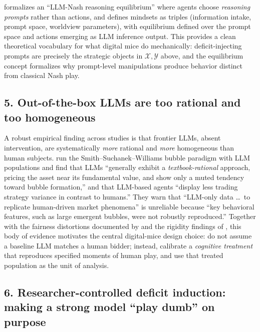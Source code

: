 \citet{zhu2025llmnash} formalizes an ``LLM-Nash reasoning equilibrium''
where agents choose \emph{reasoning prompts} rather than actions, and
defines mindsets as triples (information intake, prompt space,
worldview parameters), with equilibrium defined over the prompt space
and actions emerging as LLM inference output. This provides a clean
theoretical vocabulary for what digital mice do mechanically:
deficit-injecting prompts are precisely the strategic objects in
$\mathcal{X}, \mathcal{Y}$ above, and the equilibrium concept formalizes
why prompt-level manipulations produce behavior distinct from
classical Nash play.

\subsection*{5. Out-of-the-box LLMs are too rational and too homogeneous}

A robust empirical finding across studies is that frontier LLMs,
absent intervention, are systematically \emph{more} rational and
\emph{more} homogeneous than human subjects.
\citet{henning2025bubbles} run the Smith--Suchanek--Williams bubble
paradigm with LLM populations and find that LLMs ``generally exhibit
a \emph{textbook-rational} approach, pricing the asset near its
fundamental value, and show only a muted tendency toward bubble
formation,'' and that LLM-based agents ``display less trading strategy
variance in contrast to humans.'' They warn that ``LLM-only data
\dots\ to replicate human-driven market phenomena'' is unreliable
because ``key behavioral features, such as large emergent bubbles,
were not robustly reproduced.'' Together with the fairness
distortions documented by \citet{peng2025funhouse} and the rigidity
findings of \citet{zheng2025bounded}, this body of evidence motivates
the central digital-mice design choice: do not assume a baseline LLM
matches a human bidder; instead, calibrate a \emph{cognitive
treatment} that reproduces specified moments of human play, and use
that treated population as the unit of analysis.

\subsection*{6. Researcher-controlled deficit induction: making a strong
model ``play dumb'' on purpose}

